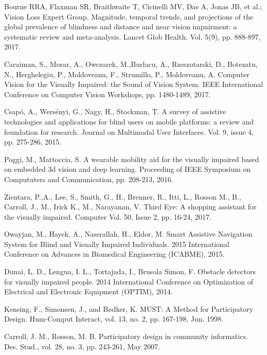 \documentclass[10pt,conference,compsocconf]{IEEEtran}
\begin{document}
\begin{thebibliography}{99}

 Bourne RRA, Flaxman SR, Braithwaite T, Cicinelli MV, Das A, Jonas JB, et al.; Vision Loss Expert Group. Magnitude, temporal trends, and projections of the global prevalence of blindness and distance and near vision impairment: a systematic review and meta-analysis. Lancet Glob Health. Vol. 5(9), pp. 888-897, 2017.


 Caraiman, S., Morar, A., Owczarek, M.,Burlacu, A., Rzeszotarski, D., Botezatu, N., Herghelegiu, P., Moldoveanu, F., Strumillo, P., Moldoveanu, A. Computer Vision for the Visually Impaired: the Sound of Vision System. IEEE International Conference on Computer Vision Workshops, pp. 1480-1489, 2017.

 Csap\'{o}, A., Wers\'{e}nyi, G., Nagy, H., Stockman, T. A survey of assistive technologies and applications for blind users on mobile platforms: a review and foundation for research. Journal on Multimodal User Interfaces. Vol. 9, issue 4,  pp. 275-286, 2015.


 Poggi, M., Mattoccia, S. A wearable mobility aid for the visually impaired based on embedded 3d vision and deep learning. Proceeding of IEEE Symposium on Compututers and Communication, pp. 208-213, 2016.

 Zientara, P.,A., Lee, S., Smith, G., H., Brenner, R., Itti, L., Rosson M., B., Carroll, J., M., Irick K., M., Narayanan, V. Third Eye: A shopping assistant for the visually impaired. Computer Vol. 50, Issue 2, pp. 16-24, 2017.


 Owayjan, M., Hayek, A., Nassrallah, H., Eldor, M. Smart Assistive Navigation System for Blind and Visually Impaired Individuals. 2015 International Conference on Advances in Biomedical Engineering (ICABME), 2015.

 Dunai, L. D., Lengua, I. L., Tortajada, I., Brusola Simon, F. Obstacle detectors for visually impaired people. 2014 International Conference on Optimization of Electrical and Electronic Equipment (OPTIM), 2014.

 Kensing, F., Simonsen, J., and B\o dker, K. MUST: A Method for Participatory Design. Hum-Comput Interact, vol. 13, no. 2, pp. 167-198, Jun. 1998.


 \noindent Carroll, J. M., Rosson, M. B. Participatory design in community informatics. Des. Stud., vol. 28, no. 3, pp. 243-261, May 2007.


\end{thebibliography}
\end{document}

